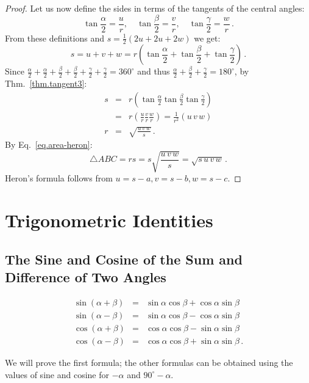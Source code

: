\begin{proof}
Let us now define the sides in terms of the tangents of the central angles:
\begin{displaymath}
\tan \frac{\alpha}{2} = \frac{u}{r},\quad
\tan \frac{\beta}{2} = \frac{v}{r},\quad
\tan \frac{\gamma}{2} = \frac{w}{r}\,.
\end{displaymath}
From these definitions and $s=\frac{1}{2}(2u+2u+2w)$ we get:
\[
s = u+v+w = r\left(\tan \frac{\alpha}{2}+\tan \frac{\beta}{2}+\tan \frac{\gamma}{2}\right)\,.
\]
Since $\frac{\alpha}{2}+\frac{\alpha}{2}+\frac{\beta}{2}+\frac{\beta}{2}+\frac{\gamma}{2}+\frac{\gamma}{2}=360^\circ$ and thus $\frac{\alpha}{2}+\frac{\beta}{2}+\frac{\gamma}{2}=180^\circ$, by Thm.~\ref{thm.tangent3}:
\begin{eqnarray*}
s&=&r\left(\tan \frac{\alpha}{2}\tan \frac{\beta}{2}\tan \frac{\gamma}{2}\right)\\
&=&r\left(\frac{u}{r}\frac{v}{r}\frac{w}{r}\right)=\frac{1}{r^2}(u\,v\,w)\\
r&=&\sqrt{\displaystyle\frac{u\,v\,w}{s}}\,.
\end{eqnarray*}
By Eq.~\ref{eq.area-heron}:
\[
\triangle ABC=rs=s\sqrt{\displaystyle\frac{u\,v\,w}{s}}=\sqrt{s\,u\,v\,w}\,.
\]
Heron's formula follows from $u=s-a, v=s-b, w=s-c$.
\end{proof}


\section{Trigonometric Identities}\label{a.trig-identities}


\subsection{The Sine and Cosine of the Sum and Difference of Two Angles} \label{s.sum-of-trig}

\begin{theorem}\label{thm.sum-of-trig}
\begin{eqnarray*}
\sin(\alpha+\beta) &=& \sin\alpha\cos\beta + \cos\alpha\sin\beta\\
\sin(\alpha-\beta) &=& \sin\alpha\cos\beta - \cos\alpha\sin\beta\\
\cos(\alpha+\beta) &=& \cos\alpha\cos\beta - \sin\alpha\sin\beta\\
\cos(\alpha-\beta) &=& \cos\alpha\cos\beta + \sin\alpha\sin\beta\,.
\end{eqnarray*}
\end{theorem}
We will prove the first formula; the other formulas can be obtained using the values of sine and cosine for $-\alpha$ and $90^\circ-\alpha$.

